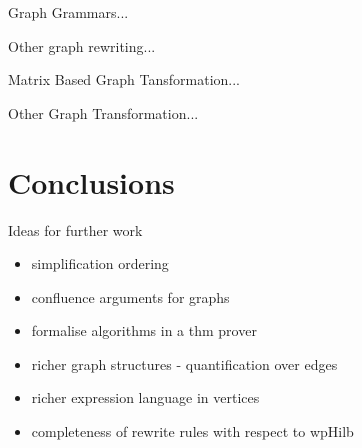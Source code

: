 \documentclass[runningheads]{llncs}
\begin{document}
Graph Grammars...

Other graph rewriting... 

Matrix Based Graph Tansformation...

Other Graph Transformation...

\section{Conclusions}
\label{sec:conclusions}

Ideas for further work
\begin{itemize}
\item simplification ordering
\item confluence arguments for graphs
\item formalise algorithms in a thm prover
\item richer graph structures - quantification over edges
\item richer expression language in vertices
\item completeness of rewrite rules with respect to wpHilb
\end{itemize}




\end{document}
